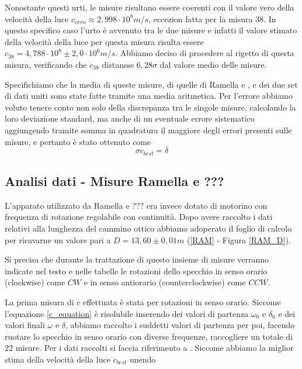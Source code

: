 \documentclass{article}
\begin{document}
Nonostante questi urti, le misure risultano essere coerenti con il valore vero della velocità della luce $c_{vero}\approx 2,998\cdot10^8 m/s$, eccezion fatta per la misura 38.
In questo specifico caso l'urto è avvenuto tra le due misure e infatti il valore stimato della velocità della luce per questa misura risulta essere $c_{38}=4,788\cdot10^8 \pm
2,0\cdot10^6 m/s$. Abbiamo deciso di procedere al rigetto di questa misura, verificando che $c_{38}$ distansse $6,28\sigma$ dal valore medio delle misure.

Specifichiamo che la media di queste misure, di quelle di Ramella e , e dei due set di dati uniti sono state fatte tramite una media aritmetica. Per l'errore
abbiamo voluto tenere conto non solo della discrepanza tra le singole misure, calcolando la loro deviazione standard, ma anche di un eventuale errore sistematico aggiungendo
tramite somma in quadratura il maggiore degli errori presenti sulle misure, e pertanto è stato ottenuto come
\begin{equation}
    \sigma c_{best}=\delta
\end{equation}











\subsection{Analisi dati - Misure Ramella e ???}

L'apparato utilizzato da Ramella e ??? era invece dotato di motorino con frequenza di rotazione regolabile con continuità. Dopo avere raccolto i dati relativi alla 
lunghezza del cammino ottico abbiamo adoperato il foglio di calcolo per ricavarne un valore pari a $D = 13,60 \pm 0,01 m$ (\ref{RAM} - Figura \ref{RAM_D}).

Si precisa che durante la trattazione di questo insieme di misure verranno indicate nel testo e nelle tabelle le rotazioni dello specchio in senso orario (clockwise) come 
$CW$ e in senso antiorario (counterclockwise) come $CCW$.

La prima misura di $c$ effettuata è stata per rotazioni in senso orario.
Siccome l'equazione \ref{c_equation} è risolubile inserendo dei valori di partenza $\omega_0$ e $\delta_0$ e dei valori finali $\omega$ e $\delta$, abbiamo raccolto
i suddetti valori di partenza per poi, facendo ruotare lo specchio in senso orario con diverse frequenze, raccogliere un totale di 22 misure. Per i dati raccolti si
faccia riferimento a . Siccome abbiamo la miglior stima della velocità della luce $c_{best}$ unendo
\end{document}
